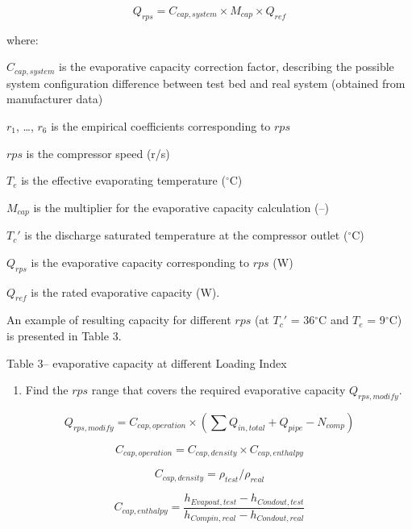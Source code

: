 \begin{equation}
  Q_{rps} = C_{cap,system} \times M_{cap} \times Q_{ref}
\end{equation}

where:

\(C_{cap,system}\) is the evaporative capacity correction factor, describing the possible system configuration difference between test bed and real system (obtained from manufacturer data)

\(r_1\), \ldots{}, \(r_6\) is the empirical coefficients corresponding to \(rps\)

\(rps\) is the compressor speed (r/s)

\(T_e\) is the effective evaporating temperature (\(^{\circ}\)C)

\(M_{cap}\) is the multiplier for the evaporative capacity calculation (--)

\({T_c}'\) is the discharge saturated temperature at the compressor outlet (\(^{\circ}\)C)

\(Q_{rps}\) is the evaporative capacity corresponding to \(rps\) (W)

\(Q_{ref}\) is the rated evaporative capacity (W).

An example of resulting capacity for different \(rps\) (at \({T_c}'\) = 36\(^{\circ}\)C and \(T_e\) = 9\(^{\circ}\)C) is presented in Table 3.

Table 3-- evaporative capacity at different Loading Index

\begin{enumerate}
\def\labelenumi{\alph{enumi}.}
\setcounter{enumi}{1}
\tightlist
\item
  Find the \(rps\) range that covers the required evaporative capacity \(Q_{rps,modify}\).
\end{enumerate}

\begin{equation}
Q_{rps,modify} = C_{cap,operation}\times(\sum{Q_{in,total}}+Q_{pipe}-N_{comp})
\end{equation}

\begin{equation}
C_{cap,operation} = C_{cap,density}\times{C_{cap,enthalpy}}
\end{equation}

\begin{equation}
C_{cap,density} = \rho_{test}/\rho_{real}
\end{equation}

\begin{equation}
C_{cap,enthalpy} = \frac{h_{Evapout,test}-h_{Condout,test}}{h_{Compin,real}-h_{Condout,real}}
\end{equation}

